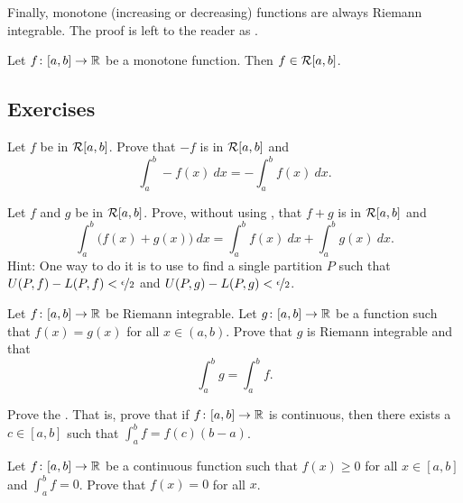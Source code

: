 Finally, monotone (increasing or decreasing) functions are always
Riemann integrable.  The proof is left to the reader as
.

\begin{prop} \label{prop:monotoneintegrable}
Let $f \colon [a,b] \to {\mathbb{R}}$ be a monotone function.  Then $f \in {\mathcal{R}}[a,b]$.
\end{prop}

\subsection{Exercises}

\begin{exercise}
Let $f$ be in ${\mathcal{R}}[a,b]$.  Prove that
$-f$ is in ${\mathcal{R}}[a,b]$ and 
\begin{equation*}
\int_a^b - f(x) ~dx = - \int_a^b f(x) ~dx .
\end{equation*}
\end{exercise}

\begin{exercise}
Let $f$ and $g$ be in ${\mathcal{R}}[a,b]$.
Prove, without using , that $f+g$ is in ${\mathcal{R}}[a,b]$ and
\begin{equation*}
\int_a^b \bigl( f(x)+g(x) \bigr) ~dx = 
\int_a^b f(x) ~dx 
+
\int_a^b g(x) ~dx .
\end{equation*}
Hint: One way to do it is to use  to find a single partition $P$
such that $U(P,f)-L(P,f) < \nicefrac{\epsilon}{2}$ and
$U(P,g)-L(P,g) < \nicefrac{\epsilon}{2}$.
\end{exercise}

\begin{exercise}
Let $f \colon [a,b] \to {\mathbb{R}}$ be Riemann integrable.  Let $g \colon [a,b] \to
{\mathbb{R}}$ be a function such that $f(x) = g(x)$ for all $x \in (a,b)$.
Prove that $g$ is Riemann integrable and that
\begin{equation*}
\int_a^b g = \int_a^b f.
\end{equation*}
\end{exercise}

\begin{exercise}
Prove the \emph{}.  That is,
prove that if $f \colon [a,b] \to {\mathbb{R}}$ is continuous, then there exists
a $c \in [a,b]$ such that $\int_a^b f = f(c)(b-a)$.
\end{exercise}

\begin{exercise}
Let $f \colon [a,b] \to {\mathbb{R}}$ be a continuous function such that $f(x) \geq 0$
for all $x \in [a,b]$ and $\int_a^b f = 0$.  Prove that $f(x) = 0$
for all $x$.
\end{exercise}

